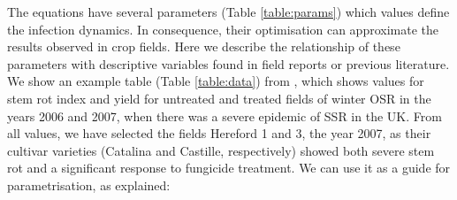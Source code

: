 \documentclass{article}
\begin{document}
The equations have several parameters (Table \ref{table:params}) which values define the infection dynamics. In consequence, their optimisation can approximate the results observed in crop fields. Here we describe the relationship of these parameters with descriptive variables found in field reports or previous literature. We show an example table (Table \ref{table:data}) from \cite{gladders:HGCA:2008}, which shows values for stem rot index and yield for untreated and treated fields of winter OSR in the years 2006 and 2007, when there was a severe epidemic of SSR in the UK. From all values, we have selected the fields Hereford 1 and 3, the year 2007, as their cultivar varieties (Catalina and Castille, respectively) showed both severe stem rot and a significant response to fungicide treatment. We can use it as a guide for parametrisation, as explained: 
\end{document}
